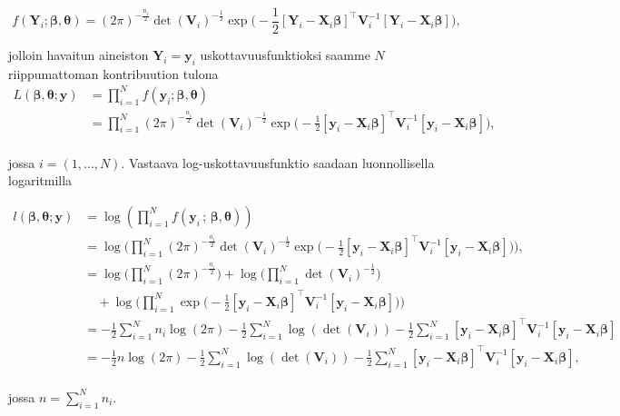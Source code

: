 \documentclass[finnish]{docopts}
\begin{document}
$$
f(\bm{Y}_i;\bm{\beta}, \bm{\theta}) = (2\pi)^{-\frac{n_i}{2}} \det (\bm{V}_i)^{-\frac{1}{2}} \exp \big( -\frac{1}{2} [\bm{Y}_i - \bm{X}_i \bm{\beta}]^\top \bm{V}_i^{-1} [\bm{Y}_i - \bm{X}_i \bm{\beta}]\big),
$$

jolloin havaitun aineiston $\bm{Y}_i = \bm{y}_i$ uskottavuusfunktioksi saamme $N$ riippumattoman kontribuution tulona \\

$$
\begin{aligned}
L(\bm{\beta}, \bm{\theta};\bm{y}) &= \prod_{i=1}^{N} f(\bm{y}_i;\bm{\beta}, \bm{\theta}) \\
&= \prod_{i=1}^{N} (2\pi)^{-\frac{n_i}{2}} \det (\bm{V}_i)^{-\frac{1}{2}} \exp \big( -\frac{1}{2} [\bm{y}_i - \bm{X}_i \bm{\beta}]^\top \bm{V}_i^{-1} [\bm{y}_i - \bm{X}_i \bm{\beta}]\big), \\
\end{aligned}
$$

jossa $i = (1,\dots, N)$. Vastaava log-uskottavuusfunktio saadaan luonnollisella logaritmilla

$$
\begin{aligned}
l(\bm{\beta}, \bm{\theta};\bm{y}) &= \log (\prod_{i=1}^{N} f(\bm{y}_i \, ; \, \bm{\beta}, \bm{\theta})) \\
&= \log \bigg(\prod_{i=1}^{N} (2\pi)^{-\frac{n_i}{2}} \det (\bm{V}_i)^{-\frac{1}{2}} \exp \big( -\frac{1}{2} [\bm{y}_i - \bm{X}_i \bm{\beta}]^\top \bm{V}_i^{-1} [\bm{y}_i - \bm{X}_i \bm{\beta}]\big) \bigg), \\
&= \log \bigg(\prod_{i=1}^{N} (2\pi)^{-\frac{n_i}{2}} \bigg) + \log \bigg(\prod_{i=1}^{N} \det (\bm{V}_i)^{-\frac{1}{2}} \bigg) \\
&\quad + \log \bigg(\prod_{i=1}^{N} \exp \big( -\frac{1}{2} [\bm{y}_i - \bm{X}_i \bm{\beta}]^\top \bm{V}_i^{-1} [\bm{y}_i - \bm{X}_i \bm{\beta}]\big) \bigg) \\
&= -\frac{1}{2} \sum\limits_{i=1}^{N} n_i \log (2\pi) -\frac{1}{2} \sum\limits_{i=1}^{N} \log (\det (\bm{V}_i)) -\frac{1}{2} \sum\limits_{i=1}^{N} [\bm{y}_i - \bm{X}_i \bm{\beta}]^\top \bm{V}_i^{-1} [\bm{y}_i - \bm{X}_i \bm{\beta}] \\
&= -\frac{1}{2} n \log (2\pi) -\frac{1}{2} \sum\limits_{i=1}^{N} \log (\det (\bm{V}_i)) -\frac{1}{2} \sum\limits_{i=1}^{N} [\bm{y}_i - \bm{X}_i \bm{\beta}]^\top \bm{V}_i^{-1} [\bm{y}_i - \bm{X}_i \bm{\beta}], \\
\end{aligned}
$$

jossa $n = \sum\limits_{i=1}^{N} n_i$.\\
\end{document}
